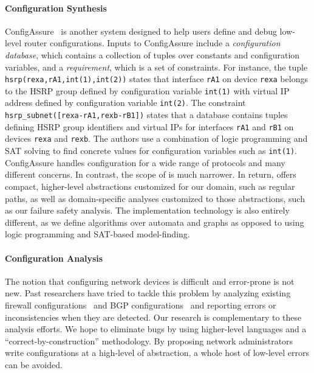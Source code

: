\paragraph*{Configuration Synthesis}
ConfigAssure~\cite{narain:lisa05,narain+:configassure}
is another system designed to
help users define and debug low-level router
configurations.  Inputs to
ConfigAssure include a \emph{configuration database}, which contains a
collection of tuples over constants and configuration variables, and a
\emph{requirement}, which is a set of constraints.  For instance, the
tuple \texttt{hsrp(rexa,rA1,int(1),int(2))} states that interface
\texttt{rA1} on device \texttt{rexa} belongs to the HSRP group defined
by configuration variable \texttt{int(1)} with virtual IP address
defined by configuration variable \texttt{int(2)}.  The constraint
\texttt{hsrp\_subnet([rexa-rA1,rexb-rB1])} states that a database
contains tuples defining HSRP group identifiers and virtual IPs for
interfaces \texttt{rA1} and \texttt{rB1} on devices \texttt{rexa} and
\texttt{rexb}.  The authors use a combination of logic programming and
SAT solving to find concrete values for configuration variables such
as \texttt{int(1)}.  ConfigAssure handles
configuration for a wide range of protocols and many
different concerns.  In contrast, the scope of \sysname is much
narrower.  In return, \sysname offers compact, higher-level
abstractions customized for our domain, such as regular paths, as well
as domain-specific analyses customized to those abstractions, such as
our failure safety analysis.  The implementation technology is also
entirely different, as we define algorithms over automata and graphs
as opposed to using logic programming and SAT-based model-finding.

\paragraph*{Configuration Analysis}  The notion that
configuring network devices is difficult and error-prone is not new.  Past
researchers have
tried to tackle this problem by analyzing existing
firewall configurations~\cite{fang,lumeta,margrave} and
BGP configurations~\cite{feamster+:rcc,feamster:thesis,ipassure,batfish,bagpipe} and reporting errors or
inconsistencies when they are detected.
Our research is complementary to these analysis
efforts.  We hope to eliminate bugs by using higher-level
languages and a ``correct-by-construction''
methodology.  By proposing network administrators write configurations
at a high-level of abstraction, a whole host of low-level errors can be
avoided.


